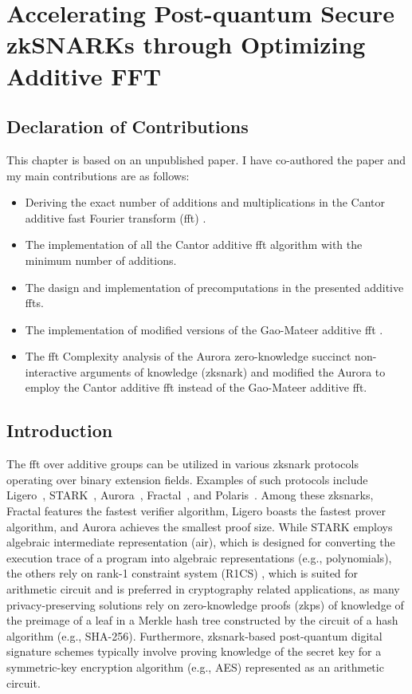 \chapter{Accelerating Post-quantum Secure zkSNARKs through Optimizing Additive FFT}\label{ch:additive-fft}

\section*{Declaration of Contributions}
This chapter is based on an unpublished paper. I have co-authored the paper and my main contributions are as follows:
\begin{itemize}
	\item Deriving the exact number of additions and multiplications in the Cantor additive fast Fourier transform (\gls{fft}) \cite{Cantor1989FFT}. 
	\item The \CC implementation of all the Cantor additive \gls{fft} algorithm with the minimum number of additions.
	\item The dasign and implementation of precomputations in the presented additive \gls{fft}s.
	\item The \CC implementation of modified versions of the Gao-Mateer additive \gls{fft} \cite{Gao2010FFT}.
	\item  The \gls{fft} Complexity analysis of the Aurora zero-knowledge succinct non-interactive arguments of knowledge (\gls{zksnark}) and modified the Aurora  \CC  to employ  the Cantor additive \gls{fft} instead of  the Gao-Mateer additive \gls{fft}.
\end{itemize}

\section{Introduction}

The \gls{fft} over additive groups can be utilized in various \gls{zksnark} protocols operating over binary extension fields. Examples of such protocols include Ligero~\cite{Ames2017Ligero}, STARK~\cite{Ben-Sasson2018STARK}, Aurora~\cite{Aurora2019}, Fractal~\cite{Chiesa2020Fractal}, and Polaris~\cite{Polaris}. Among these \gls{zksnark}s, Fractal features the fastest verifier algorithm, Ligero boasts the fastest prover algorithm, and Aurora achieves the smallest proof size. While STARK employs algebraic intermediate representation (\gls{air}), which is designed for converting the execution trace of a program into algebraic representations (e.g., polynomials), the others rely on rank-1 constraint system (R1CS) \cite{Gong2024}, which is suited for arithmetic circuit and is preferred in cryptography related applications, as many privacy-preserving solutions rely on zero-knowledge proofs (\gls{zkp}s) of knowledge of the preimage of a leaf in a Merkle hash tree constructed by the circuit of a hash algorithm (e.g., SHA-256). Furthermore, \gls{zksnark}-based post-quantum digital signature schemes typically involve proving knowledge of the secret key for a symmetric-key encryption algorithm (e.g., AES) represented as an arithmetic circuit.


